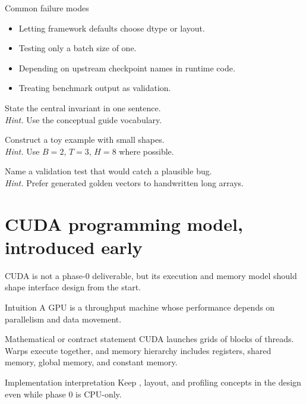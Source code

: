 \begin{warningbox}{Common failure modes}
\begin{itemize}
\item Letting framework defaults choose dtype or layout.
\item Testing only a batch size of one.
\item Depending on upstream checkpoint names in runtime code.
\item Treating benchmark output as validation.
\end{itemize}
\end{warningbox}

\begin{chapterexercises}
\item State the central invariant in one sentence.\\
\textit{Hint.} Use the conceptual guide vocabulary.
\item Construct a toy example with small shapes.\\
\textit{Hint.} Use $B=2$, $T=3$, $H=8$ where possible.
\item Name a validation test that would catch a plausible bug.\\
\textit{Hint.} Prefer generated golden vectors to handwritten long arrays.
\end{chapterexercises}

\chapter{CUDA programming model, introduced early}
\label{ch:cuda-intro}
CUDA is not a phase-0 deliverable, but its execution and memory model should shape interface design from the start. \citep{cudaProgrammingGuide,cudaArchive,cuda13ReleaseNotes}



\begin{intuitionbox}{Intuition}
A GPU is a throughput machine whose performance depends on parallelism and data movement.
\end{intuitionbox}

\begin{definitionbox}{Mathematical or contract statement}
CUDA launches grids of blocks of threads. Warps execute together, and memory hierarchy includes registers, shared memory, global memory, and constant memory.
\end{definitionbox}

\begin{implementationbox}{Implementation interpretation}
Keep , layout, and profiling concepts in the design even while phase 0 is CPU-only.
\end{implementationbox}

